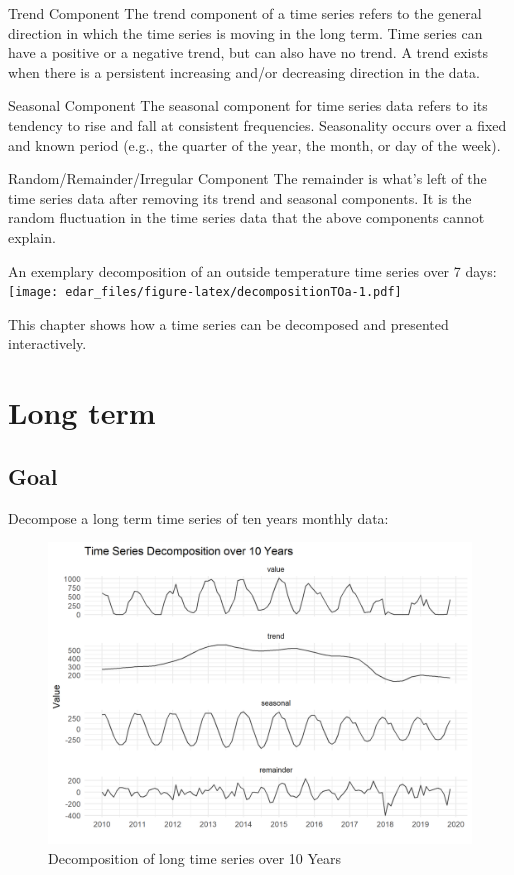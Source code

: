 \documentclass[
  a4paperpaper,
]{book}
\begin{document}
Trend Component
The trend component of a time series refers to the general direction in which the time series is moving in the long term. Time series can have a positive or a negative trend, but can also have no trend.
A trend exists when there is a persistent increasing and/or decreasing direction in the data.

Seasonal Component
The seasonal component for time series data refers to its tendency to rise and fall at consistent frequencies. Seasonality occurs over a fixed and known period (e.g., the quarter of the year, the month, or day of the week).

Random/Remainder/Irregular Component
The remainder is what's left of the time series data after removing its trend and seasonal components. It is the random fluctuation in the time series data that the above components cannot explain.

An exemplary decomposition of an outside temperature time series over 7 days:
\texttt{[image: edar\_files/figure-latex/decompositionTOa-1.pdf]}

This chapter shows how a time series can be decomposed and presented interactively.

\newpage

\hypertarget{long-term}{%
\section{Long term}\label{long-term}}

\hypertarget{goal-4}{%
\subsection{Goal}\label{goal-4}}

Decompose a long term time series of ten years monthly data:

\begin{figure}
\includegraphics[width=0.7\linewidth]{images/plotDecompositionLong} \caption{Decomposition of long time series over 10 Years}\label{fig:unnamed-chunk-12}
\end{figure}
\end{document}
